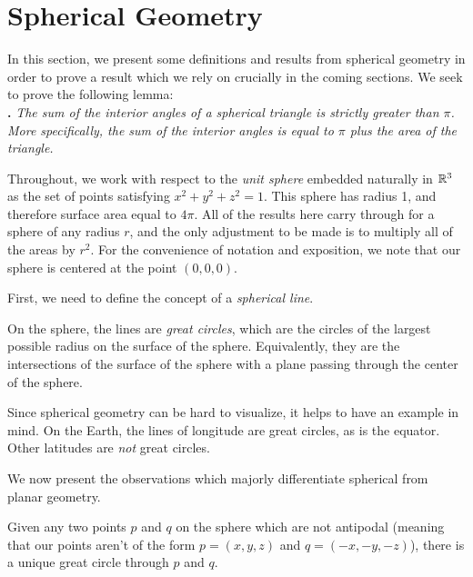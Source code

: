 \section{Spherical Geometry}
In this section, we present some definitions and results from spherical geometry in order to prove a result which we rely on crucially in the coming sections.  We seek to prove the following lemma:\\

\noindent\textbf{.}
\emph{The sum of the interior angles of a spherical triangle is strictly greater than $\pi$.  More specifically, the sum of the interior angles is equal to $\pi$ plus the area of the triangle.}


Throughout, we work with respect to the \textit{unit sphere} embedded naturally in $\mathbb{R}^3$ as the set of points satisfying $x^2+y^2+z^2=1$.  This sphere has radius 1, and therefore surface area equal to $4\pi$.  All of the results here carry through for a sphere of any radius $r$, and the only adjustment to be made is to multiply all of the areas by $r^2$.  For the convenience of notation and exposition, we note that our sphere is centered at the point $(0,0,0)$.

First, we need to define the concept of a \textit{spherical line}.  

\begin{definition}
On the sphere, the lines are \textit{great circles}, which are the circles of the largest possible radius on the surface of the sphere.  Equivalently, they are the intersections of the surface of the sphere with a plane passing through the center of the sphere.
\end{definition}  


Since spherical geometry can be hard to visualize, it helps to have an example in mind.  On the Earth, the lines of longitude are great circles, as is the equator.  Other latitudes are \textit{not} great circles.





We now present the observations which majorly differentiate spherical from planar geometry.

\begin{claim}
	Given any two points $p$ and $q$ on the sphere which are not antipodal (meaning that our points aren't of the form $p=(x,y,z)$ and $q=(-x,-y,-z)$), there is a unique great circle through $p$ and $q$. 
\end{claim}

